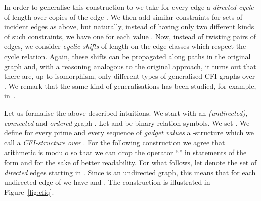 \documentclass[a4paper,UKenglish]{lipics}
\newcommand{\logic}[1]{\ensuremath{\textsc{#1}}\xspace}
\theoremstyle{plain}
\begin{document}
In order to generalise this construction to  we take for 
every edge  a \emph{directed cycle} of length  over  copies 
 of the edge .
We then add similar constraints for sets of incident edges as above, but 
naturally, instead of having only two different kinds of such constraints, we 
have one for each value .
Now, instead of twisting pairs of edges, we consider 
\emph{cyclic shifts} of length  on the edge classes  which respect the cycle relation. Again, these shifts can be 
propagated along paths in the original graph  and, with a reasoning 
analogous to the original approach, it turns out that there are, up to 
isomorphism, only  different types of generalised CFI-graphs over . We remark that the same kind of generalisations has been studied, 
for example, in~\cite{Ho10,To04}.

\newcommand{\CFI}{\ensuremath{\logic{CFI}_q}}

\smallskip
Let us formalise the above described intuitions.
We start with an \emph{(undirected), connected} 
and \emph{ordered} graph .
Let  and  be binary relation symbols.
We set .
We define for every prime  and every sequence of \emph{gadget values} 
 a -structure  which we call a \emph{CFI-structure over 
}.
For the following construction we agree that arithmetic is modulo  so that 
we can drop the operator ``'' in 
statements 
of the form  and  for the sake of better readability. 
For what follows, let  denote the set of \emph{directed} 
edges starting in . 
Since  is an undirected graph, this means that for each undirected edge 
 of  we have  and .
The construction is illustrated in Figure~\ref{fig:cfiq}.
\end{document}
